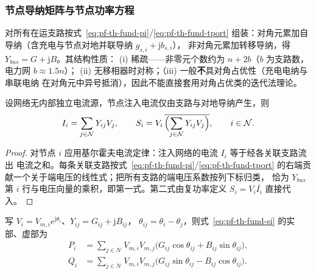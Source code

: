 \subsubsection{节点导纳矩阵与节点功率方程}

\begin{definition}[节点导纳矩阵]\label{def:pf-th-fund-ybus}
对所有在运支路按式~\eqref{eq:pf-th-fund-pi}/\eqref{eq:pf-th-fund-tport}
组装：对角元累加自导纳（含充电与节点对地并联导纳 $g_{s,i}+\mathrm jb_{s,i}$），
非对角元累加转移导纳，得 $Y_{bus}=G+\mathrm jB$。其结构性质：
(i) 稀疏——非零元个数约为 $n+2b$（$b$ 为支路数，电力网 $b\approx1.5n$）；
(ii) 无移相器时对称；（iii) 一般\textbf{不}具对角占优性（充电电纳与串联电纳
在对角元中异号抵消），因此不能直接套用对角占优类的迭代法理论。
\end{definition}

\begin{theorem}[节点功率方程]\label{thm:pf-th-fund-power-eq}
设网络无内部独立电流源，节点注入电流仅由支路与对地导纳产生，则
\begin{equation}
I_i=\sum_{j\in\mathcal N}Y_{ij}V_j,\qquad
S_i=V_i\,\overline{\Bigl(\sum_{j\in\mathcal N}Y_{ij}V_j\Bigr)},
\qquad i\in\mathcal N .
\label{eq:pf-th-fund-si}
\end{equation}
\end{theorem}

\begin{proof}
对节点 $i$ 应用基尔霍夫电流定律：注入网络的电流 $I_i$ 等于经各关联支路流出
电流之和。每条关联支路按式~\eqref{eq:pf-th-fund-pi}/\eqref{eq:pf-th-fund-tport}
的右端贡献一个关于端电压的线性式；把所有支路的端电压系数按列下标归类，
恰为 $Y_{bus}$ 第 $i$ 行与电压向量的乘积，即第一式。第二式由复功率定义
$S_i=V_i\overline{I_i}$ 直接代入。
\end{proof}

\begin{corollary}[极坐标功率方程]\label{cor:pf-th-fund-polar}
写 $V_i=V_{m,i}e^{\mathrm j\theta_i}$、$Y_{ij}=G_{ij}+\mathrm jB_{ij}$，
$\theta_{ij}=\theta_i-\theta_j$，则式~\eqref{eq:pf-th-fund-si} 的实部、虚部为
\begin{align}
P_i&=\sum_{j\in\mathcal N}V_{m,i}V_{m,j}
\bigl(G_{ij}\cos\theta_{ij}+B_{ij}\sin\theta_{ij}\bigr),\label{eq:pf-th-fund-polar-p}\\
Q_i&=\sum_{j\in\mathcal N}V_{m,i}V_{m,j}
\bigl(G_{ij}\sin\theta_{ij}-B_{ij}\cos\theta_{ij}\bigr).\label{eq:pf-th-fund-polar-q}
\end{align}
\end{corollary}

